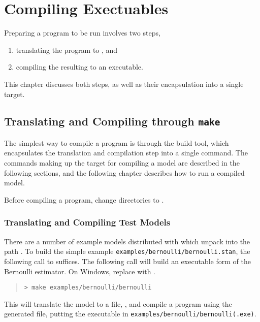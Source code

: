 \chapter{Compiling \CmdStan Exectuables}\label{compiling.chapter}

\noindent
Preparing a \Stan program to be run involves two steps,
%
\begin{enumerate}
\item translating the \Stan program to \Cpp, and
\item compiling the resulting \Cpp to an executable.
\end{enumerate}
%
This chapter discusses both steps, as well as their encapsulation into
a single  target.

\section{Translating and Compiling through {\tt\bfseries make}}\label{make-models.section}

The simplest way to compile a \CmdStan program is through the
 build tool, which encapsulates the translation and
compilation step into a single command.  The commands making up the
 target for compiling a model are described in the
following sections, and the following chapter describes how to run a
compiled model.

Before compiling a \CmdStan program, change directories to
. 

\subsection{Translating and Compiling Test Models}

There are a number of example models distributed with \CmdStan which
unpack into the path .  To build the simple example
\nolinkurl{examples/bernoulli/bernoulli.stan}, the following call to
 suffices.
%
The following call will build an executable form of the Bernoulli
estimator. On Windows, replace  with .
%
\begin{quote}
\begin{Verbatim}[fontshape=sl]
> make examples/bernoulli/bernoulli
\end{Verbatim}
\end{quote}
%
This will translate the model  to a \Cpp file,
, and compile a \CmdStan program using the
generated \Cpp file, putting the executable in
\nolinkurl{examples/bernoulli/bernoulli(.exe)}.

